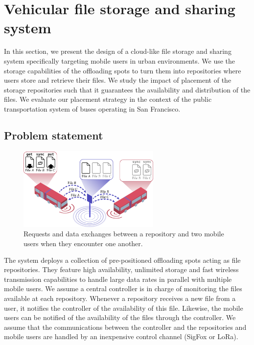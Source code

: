 \section{Vehicular file storage and sharing system}
\label{sec:vehicular-storage-sharing}

In this section, we present the design of a cloud-like file storage and sharing system specifically targeting mobile users in urban environments. We use the storage capabilities of the offloading spots to turn them into repositories where users store and retrieve their files. %
We study the impact of placement of the storage repositories such that it guarantees the availability and distribution of the files. We evaluate our placement strategy in the context of the public transportation system of buses operating in San Francisco. 

\subsection{Problem statement}

\begin{figure}
    \centering
    \includegraphics[width=7cm]{figures/message-exchanged.pdf}
    \caption{Requests and data exchanges between a repository and two mobile users when they encounter one another.}
    \label{fig:request-exchange}
\end{figure}
The system deploys a collection of pre-positioned offloading spots acting as file repositories. They feature high availability, unlimited storage and fast wireless transmission capabilities to handle large data rates in parallel with multiple mobile users. We assume a central controller is in charge of monitoring the files available at each repository. Whenever a repository receives a new file from a user, it notifies the controller of the availability of this file. Likewise, the mobile users can be notified of the availability of the files through the controller. We assume that the communications between the controller and the repositories and mobile users are handled by an inexpensive control channel (\eg SigFox or LoRa).

